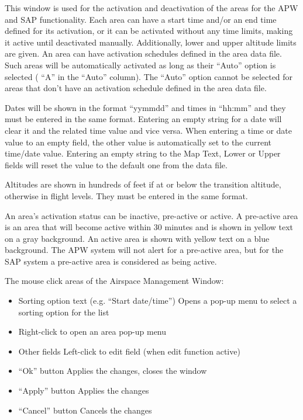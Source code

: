 \documentclass[11pt,a4paper,oldfontcommands]{memoir}
\begin{document}
This window is used for the activation and deactivation of the areas for the APW and SAP functionality. Each area can have a start time and/or an end time defined for its activation, or it can be activated without any time limits, making it active until deactivated manually. Additionally, lower and upper altitude limits are given. An area can have activation schedules defined in the area data file. Such areas will be automatically activated as long as their “Auto” option is selected ( “A” in the “Auto” column). The “Auto” option cannot be selected for areas that don’t have an activation schedule defined in the area data file.

Dates will be shown in the format “yymmdd” and times in “hh:mm” and they must be entered in the same format. Entering an empty string for a date will clear it and the related time value and vice versa. When entering a time or date value to an empty field, the other value is automatically set to the current time/date value. Entering an empty string to the Map Text, Lower or Upper fields will reset the value to the default one from the data file.

Altitudes are shown in hundreds of feet if at or below the transition altitude, otherwise in flight levels. They must be entered in the same format.

An area’s activation status can be inactive, pre-active or active. A pre-active area is an area that will become active within 30 minutes and is shown in yellow text on a gray background. An active area is shown with yellow text on a blue background. The APW system will not alert for a pre-active area, but for the SAP system a pre-active area is considered as being active.

The mouse click areas of the Airspace Management Window:
\begin{itemize}[\textbullet] 
        \item Sorting option text (e.g. “Start date/time”) Opens a pop-up menu to select a sorting option for the list 
        \item Right-click to open an area pop-up menu
        \item Other fields Left-click to edit field (when edit function active)
        \item “Ok” button Applies the changes, closes the window
        \item “Apply” button Applies the changes
        \item “Cancel” button Cancels the changes 
\end{itemize}
\end{document}
